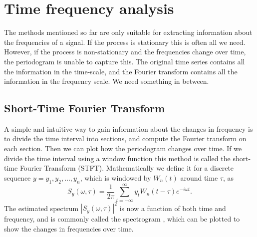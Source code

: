 \documentclass[a4paper, 10pt]{memoir}
\theoremstyle{plain}
\theoremstyle{definition}
\theoremstyle{remark}
\begin{document}
\section{Time frequency analysis}
The methods mentioned so far are only suitable for extracting information about the frequencies of a signal.
If the process is stationary this is often all we need.
However, if the process is non-stationary and the frequencies change over time, the periodogram is unable to capture this.
The original time series contains all the information in the time-scale, and the Fourier transform contains all the information in the frequency scale.
We need something in between.

\subsection{Short-Time Fourier Transform}
A simple and intuitive way to gain information about the changes in frequency is to divide the time interval into sections, and compute the Fourier transform on each section.
Then we can plot how the periodogram changes over time.
If we divide the time interval using a window function this method is called the short-time Fourier Transform (STFT).
Mathematically we define it for a discrete sequence $y = y_1, y_2, \hdots, y_n$, which is windowed by $W_n(t)$ around time $\tau$, as
\begin{equation}\label{eq:stft}
        S_y(\omega, \tau) = \frac{1}{2 \pi} \sum_{t = -\infty}^{\infty}y_t W_n(t - \tau)e^{-i\omega t}.
\end{equation}
The estimated spectrum $|S_y(\omega, \tau)|^2$ is now a function of both time and frequency, and is commonly called the spectrogram \cite{cohen}, which can be plotted to show the changes in frequencies over time.
\end{document}
